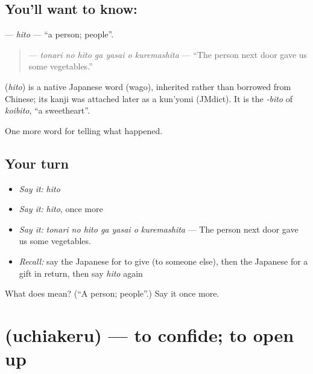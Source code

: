 \subsection*{You'll want to know: }
\textbf{} — \emph{hito} — \textquotedblleft{}a person; people\textquotedblright{}.

\begin{quote}
\textbf{   } — \emph{tonari no hito ga yasai o kuremashita} — \textquotedblleft{}The person next door gave us some vegetables.\textquotedblright{}
\end{quote}

\begin{cousinweb}
\textbf{} (\emph{hito}) is a native Japanese word (wago), inherited rather than borrowed from Chinese; its kanji was attached later as a kun'yomi (JMdict). It is the \emph{-bito} of \emph{koibito}, \textquotedblleft{}a sweetheart\textquotedblright{}.
\end{cousinweb}

\begin{grammarlens}[title={What you've built}]
One more word for telling what happened.
\end{grammarlens}

\subsection*{Your turn}
\begin{itemize}
\raggedright
  \item \emph{Say it:} \emph{hito}
  \item \emph{Say it:} \emph{hito}, once more
  \item \emph{Say it:} \emph{tonari no hito ga yasai o kuremashita} — The person next door gave us some vegetables.
  \item \emph{Recall:} say the Japanese for to give (to someone else), then the Japanese for a gift in return, then say \emph{hito} again
\end{itemize}

\begin{tcolorbox}[breakable,colback=teal!4,colframe=teal!35!black,title={Before you move on}]
What does  mean? (\textquotedblleft{}A person; people\textquotedblright{}.) Say it once more.
\end{tcolorbox}
\section[\texorpdfstring{\ja{うちあける} (uchiakeru)}{うちあける (uchiakeru)}]{ (uchiakeru) — to confide; to open up}

